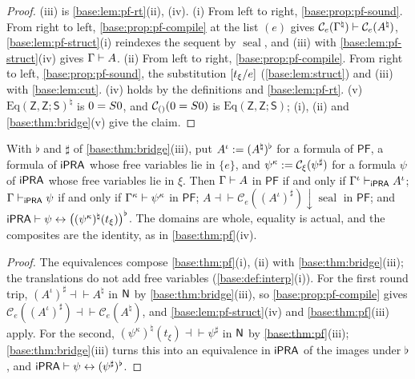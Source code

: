 \begin{proof}
(iii) is \cref{base:lem:pf-rt}(ii), (iv).  (i) From left to right,
\cref{base:prop:pf-sound}.  From right to left,
\cref{base:prop:pf-compile} at the list $(e)$ gives
$\mathcal C_e(\Gamma^\natural)\vdash\mathcal C_e(A^\natural)$,
\cref{base:lem:pf-struct}(i) reindexes the sequent by $\operatorname{seal}$,
and (iii) with \cref{base:lem:pf-struct}(iv) gives $\Gamma\vdash A$.  (ii)
From left to right, \cref{base:prop:pf-compile}.  From right to left,
\cref{base:prop:pf-sound}, the substitution $[t_\xi/e]$
(\cref{base:lem:struct}) and (iii) with \cref{base:lem:cut}.  (iv) holds by
the definitions and \cref{base:lem:pf-rt}.  (v)
$\mathrm{Eq}(\mathsf Z,\mathsf Z;\mathsf S)^\natural$ is $0=S 0$, and
$\mathcal C_{()}(0=S 0)$ is $\mathrm{Eq}(\mathsf Z,\mathsf Z;\mathsf S)$;
(i), (ii) and \cref{base:thm:bridge}(v) give the claim.
\end{proof}

\begin{corollary}
\label{base:cor:pf-ipra}
With $\flat$ and $\sharp$ of \cref{base:thm:bridge}(iii), put
$A^{\iota}\mathrel{:=}(A^\natural)^{\flat}$ for a formula of $\mathsf{PF}$, a
formula of $\mathsf{iPRA}$ whose free variables lie in $\{e\}$, and
$\psi^{\kappa}\mathrel{:=}\mathcal C_\xi(\psi^{\sharp})$ for a formula $\psi$ of
$\mathsf{iPRA}$ whose free variables lie in $\xi$.  Then
$\Gamma\vdash A$ in $\mathsf{PF}$ if and only if
$\Gamma^{\iota}\vdash_{\mathsf{iPRA}}A^{\iota}$;
$\Gamma\vdash_{\mathsf{iPRA}}\psi$ if and only if
$\Gamma^{\kappa}\vdash\psi^{\kappa}$ in $\mathsf{PF}$;
$A\dashv\vdash\mathcal C_e((A^{\iota})^{\sharp}){\downarrow}\operatorname{seal}$
in $\mathsf{PF}$; and
$\mathsf{iPRA}\vdash\psi\leftrightarrow\bigl((\psi^{\kappa})^\natural(t_\xi)\bigr)^{\flat}$.
The domains are whole, equality is actual, and the composites are the
identity, as in \cref{base:thm:pf}(iv).
\end{corollary}

\begin{proof}
The equivalences compose \cref{base:thm:pf}(i), (ii) with
\cref{base:thm:bridge}(iii); the translations do not add free variables
(\cref{base:def:interp}(i)).  For the first round trip,
$(A^{\iota})^{\sharp}\dashv\vdash A^\natural$ in $\mathsf{N}$ by
\cref{base:thm:bridge}(iii), so \cref{base:prop:pf-compile} gives
$\mathcal C_e((A^{\iota})^{\sharp})\dashv\vdash\mathcal C_e(A^\natural)$, and
\cref{base:lem:pf-struct}(iv) and \cref{base:thm:pf}(iii) apply.  For the
second, $(\psi^{\kappa})^\natural(t_\xi)\dashv\vdash\psi^{\sharp}$ in $\mathsf{N}$
by \cref{base:thm:pf}(iii); \cref{base:thm:bridge}(iii) turns this into an
equivalence in $\mathsf{iPRA}$ of the images under $\flat$, and
$\mathsf{iPRA}\vdash\psi\leftrightarrow(\psi^{\sharp})^{\flat}$.
\end{proof}

